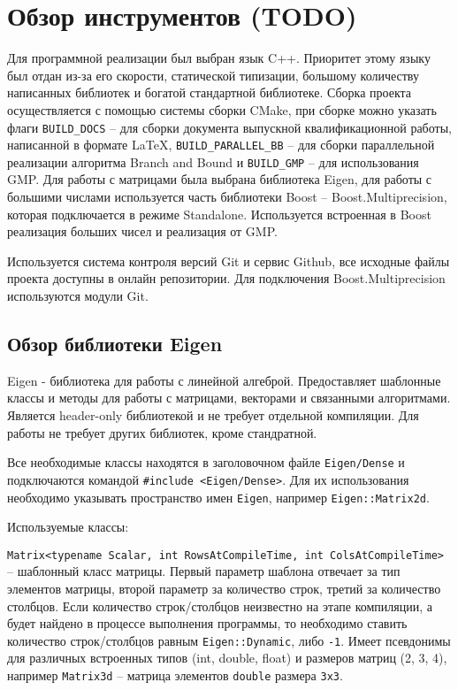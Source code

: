 \newpage

\section{Обзор инструментов (TODO)}

Для программной реализации был выбран язык C++. Приоритет этому языку был отдан из-за его скорости, статической типизации, большому количеству написанных библиотек и богатой стандартной библиотеке. Сборка проекта осуществляется с помощью системы сборки CMake, при сборке можно указать флаги \verb!BUILD_DOCS! -- для сборки документа выпускной квалификационной работы, написанной в формате \LaTeX, \verb!BUILD_PARALLEL_BB! -- для сборки параллельной реализации алгоритма Branch and Bound и \verb!BUILD_GMP! -- для использования GMP. Для работы с матрицами была выбрана библиотека Eigen, для работы с большими числами используется часть библиотеки Boost -- Boost.Multiprecision, которая подключается в режиме Standalone. Используется встроенная в Boost реализация больших чисел и реализация от GMP.

Используется система контроля версий Git и сервис Github, все исходные файлы проекта доступны в онлайн репозитории. Для подключения Boost.Multiprecision используются модули Git.

\subsection{Обзор библиотеки Eigen}

Eigen - библиотека для работы с линейной алгеброй. Предоставляет шаблонные классы и методы для работы с матрицами, векторами и связанными алгоритмами. Является header-only библиотекой и не требует отдельной компиляции. Для работы не требует других библиотек, кроме стандратной.

Все необходимые классы находятся в заголовочном файле \verb!Eigen/Dense! и подключаются командой \verb!#include <Eigen/Dense>!. Для их использования необходимо указывать пространство имен \verb!Eigen!, например \verb!Eigen::Matrix2d!.

Используемые классы:

\verb!Matrix<typename Scalar, int RowsAtCompileTime, int ColsAtCompileTime>! -- шаблонный класс матрицы. Первый параметр шаблона отвечает за тип элементов матрицы, второй параметр за количество строк, третий за количество столбцов. Если количество строк/столбцов неизвестно на этапе компиляции, а будет найдено в процессе выполнения программы, то необходимо ставить количество строк/столбцов равным \verb!Eigen::Dynamic!, либо \verb!-1!. Имеет псевдонимы для различных встроенных типов (int, double, float) и размеров матриц (2, 3, 4), например \verb!Matrix3d! -- матрица элементов \verb!double! размера \verb!3x3!. 

